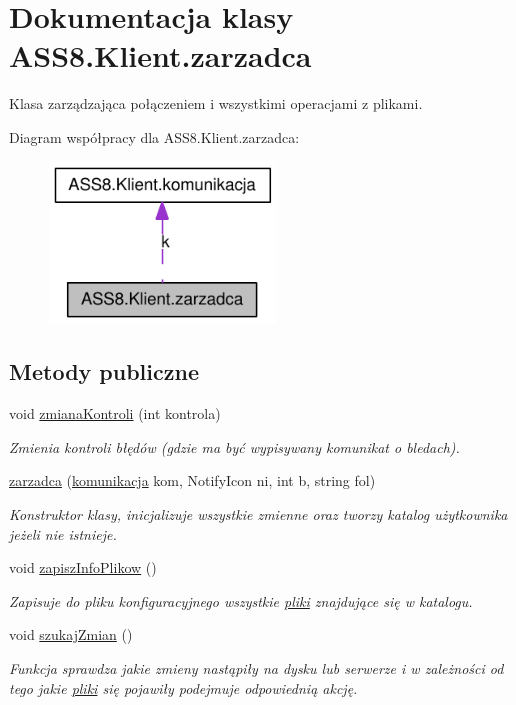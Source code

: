 \hypertarget{a00037}{
\section{Dokumentacja klasy ASS8.Klient.zarzadca}
\label{d1/dc6/a00037}
}
Klasa zarządzająca połączeniem i wszystkimi operacjami z plikami.  


Diagram współpracy dla ASS8.Klient.zarzadca:\nopagebreak
\begin{figure}[H]
\begin{center}
\leavevmode
\includegraphics[width=170pt]{d3/dd5/a00215}
\end{center}
\end{figure}
\subsection*{Metody publiczne}
\begin{CompactItemize}
\item 
void \hyperlink{a00037_facd9f376d18bedf9eb790ea68e23cf2}{zmianaKontroli} (int kontrola)
\begin{CompactList}\small\item\em Zmienia kontroli błędów (gdzie ma być wypisywany komunikat o bledach). \item\end{CompactList}\item 
\hyperlink{a00037_fefaf155f21b7d7cafd855f1c3fdb21d}{zarzadca} (\hyperlink{a00013}{komunikacja} kom, NotifyIcon ni, int b, string fol)
\begin{CompactList}\small\item\em Konstruktor klasy, inicjalizuje wszystkie zmienne oraz tworzy katalog użytkownika jeżeli nie istnieje. \item\end{CompactList}\item 
void \hyperlink{a00037_0b7572681d52b2aff3d3b300639e66b9}{zapiszInfoPlikow} ()
\begin{CompactList}\small\item\em Zapisuje do pliku konfiguracyjnego wszystkie \hyperlink{a00017}{pliki} znajdujące się w katalogu. \item\end{CompactList}\item 
void \hyperlink{a00037_23c6a981e5d8340c7207a7cbbd5d710e}{szukajZmian} ()
\begin{CompactList}\small\item\em Funkcja sprawdza jakie zmieny nastąpiły na dysku lub serwerze i w zależności od tego jakie \hyperlink{a00017}{pliki} się pojawiły podejmuje odpowiednią akcję. \item\end{CompactList}\end{CompactItemize}
